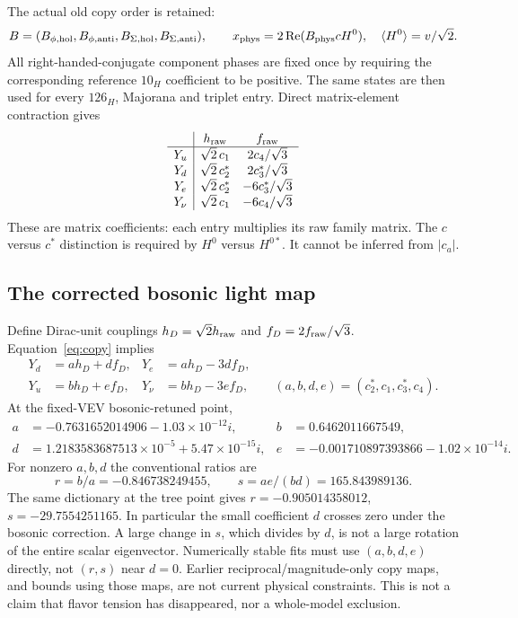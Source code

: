 \documentclass[11pt]{article}
\begin{document}
The actual old copy order is retained:
\begin{equation}
 B=(B_{\phi,\rm hol},B_{\phi,\rm anti},
 B_{\Sigma,\rm hol},B_{\Sigma,\rm anti}),\qquad
 x_{\rm phys}=2\operatorname{Re}(B_{\rm phys}c H^0),\quad
 \langle H^0\rangle=v/\sqrt2.
\end{equation}
All right-handed-conjugate component phases are fixed once by requiring
the corresponding reference $10_H$ coefficient to be positive. The same
states are then used for every $126_H$, Majorana and triplet entry. Direct
matrix-element contraction gives
\begin{equation}
\begin{array}{c|cc}
 &h_{\rm raw}&f_{\rm raw}\\\hline
 Y_u&\sqrt2\,c_1&2c_4/\sqrt3\\
 Y_d&\sqrt2\,c_2^*&2c_3^*/\sqrt3\\
 Y_e&\sqrt2\,c_2^*&-6c_3^*/\sqrt3\\
 Y_\nu&\sqrt2\,c_1&-6c_4/\sqrt3
\end{array}
\label{eq:copy}
\end{equation}
These are matrix coefficients: each entry multiplies its raw family matrix.
The $c$ versus $c^*$ distinction is required by $H^0$ versus $H^{0*}$.
It cannot be inferred from $|c_a|$.

\subsection{The corrected bosonic light map}
Define Dirac-unit couplings $h_D=\sqrt2h_{\rm raw}$ and
$f_D=2f_{\rm raw}/\sqrt3$. Equation~\eqref{eq:copy} implies
\begin{align}
Y_d&=a h_D+d f_D,&Y_e&=a h_D-3d f_D,\\
Y_u&=b h_D+e f_D,&Y_\nu&=b h_D-3e f_D,\qquad
(a,b,d,e)=(c_2^*,c_1,c_3^*,c_4).
\end{align}
At the fixed-VEV bosonic-retuned point,
\begin{align}
a&=-0.7631652014906-1.03\times10^{-12}i,&b&=0.6462011667549,\\
d&=1.2183583687513\times10^{-5}+5.47\times10^{-15}i,&
e&=-0.001710897393866-1.02\times10^{-14}i.
\end{align}
For nonzero $a,b,d$ the conventional ratios are
\begin{equation}
r=b/a=-0.846738249455,\qquad s=ae/(bd)=165.843989136.
\end{equation}
The same dictionary at the tree point gives
$r=-0.905014358012$, $s=-29.7554251165$.
In particular the small coefficient $d$ crosses zero under the bosonic
correction. A large change in $s$, which divides by $d$, is not a
large rotation of the entire scalar eigenvector. Numerically stable fits
must use $(a,b,d,e)$ directly, not $(r,s)$ near $d=0$.
Earlier reciprocal/magnitude-only copy maps, and bounds using those maps,
are not current physical constraints. This is not a claim that flavor
tension has disappeared, nor a whole-model exclusion.
\end{document}
